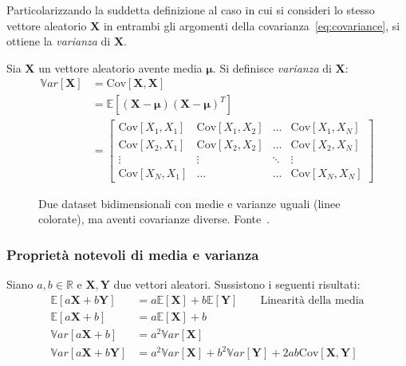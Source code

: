 \medskip
\noindent Particolarizzando la suddetta definizione al caso in cui si consideri lo stesso vettore aleatorio $\mathbf{X}$ in entrambi gli argomenti della 
covarianza~\eqref{eq:covariance}, si ottiene la \emph{varianza} di $\mathbf{X}$.

\medskip
\begin{Mybox}
    \begin{definizione}[Varianza]
     Sia $\mathbf{X}$ un vettore aleatorio avente media $\bm{\mu}$. Si definisce \emph{varianza} di $\mathbf{X}$:
    \begin{equation}
     \begin{split}
        \mathbb{V}ar[\mathbf{X}]& = \text{Cov}[\mathbf{X},\mathbf{X}] \\
        & = \mathbb{E}[(\mathbf{X}-\bm{\mu})(\mathbf{X}-\bm{\mu})^T] \\
        & =
        \begin{bmatrix}
            \text{Cov}[X_1,X_1] &\text{Cov}[X_1,X_2] & \dots &\text{Cov}[X_1,X_N] \\
            \text{Cov}[X_2,X_1] & \text{Cov}[X_2,X_2] & \dots & \text{Cov}[X_2,X_N] \\
            \vdots & \vdots & \ddots & \vdots \\
            \text{Cov}[X_N,X_1] & \dots & \dots & \text{Cov}[X_N,X_N]
        \end{bmatrix}
     \end{split}
    \end{equation}
    \end{definizione}
\end{Mybox}

\begin{figure}
    \centering
     \quad
  \caption{Due dataset bidimensionali con medie e varianze uguali (linee colorate), ma aventi covarianze diverse. Fonte~\cite{deisenrothMML2020}.}
\label{fig:bgvfcd}
\end{figure}


\subsubsection{Proprietà notevoli di media e varianza}

Siano $a, b \in \mathbb{R}$ e $\mathbf{X}, \mathbf{Y}$ due vettori aleatori. Sussistono i seguenti risultati:
\begin{align}
    \mathbb{E}[a\mathbf{X}+b\mathbf{Y}]   & = a\mathbb{E}[\mathbf{X}]+b\mathbb{E}[\mathbf{Y}] \qquad \text{Linearità della media} \label{eq:prop_media1}\\
    \mathbb{E}[a\mathbf{X}+b]   & = a\mathbb{E}[\mathbf{X}]+b \label{eq:prop_media2}\\
    \mathbb{V}ar[a\mathbf{X}+b] & = a^2\mathbb{V}ar[\mathbf{X}] \label{eq:prop_varianza1} \\
    \mathbb{V}ar[a\mathbf{X}+b\mathbf{Y}] & = a^2\mathbb{V}ar[\mathbf{X}] + b^2\mathbb{V}ar[\mathbf{Y}]+2ab\text{Cov}[\mathbf{X},\mathbf{Y}]\label{eq:prop_varianza2}
\end{align}
